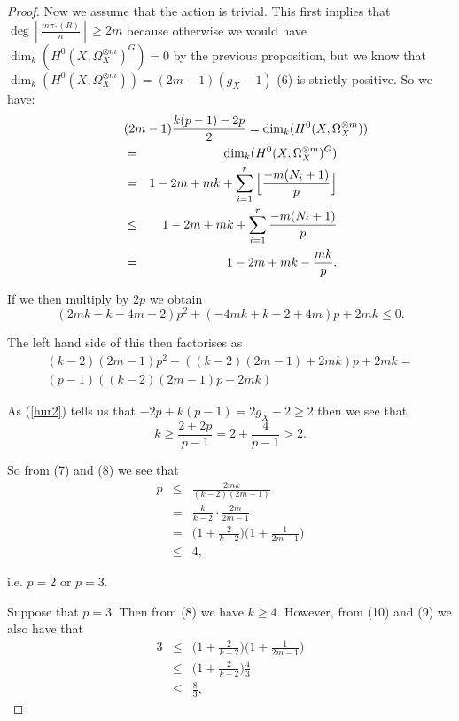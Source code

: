 \documentclass[11pt]{article} %
\theoremstyle{remark}\newtheorem*{rem}{Remark}
\begin{document}
\begin{proof}
	Now we assume that the action is trivial. This first implies that 
	$\deg \left\lfloor\frac{m\pi_*(R)}{n}\right\rfloor \geq 2m$ because otherwise we would 
	have $\dim_k(H^0(X,\Omega_X^{\otimes m})^G)=0$ by the previous proposition, but we know that 
	$\dim_k(H^0(X,\Omega_X^{\otimes m}))=(2m-1)(g_X-1)$ (6) is strictly positive. So we have:
		\begin{eqnarray}
			\lefteqn{(2m-1)\frac{k(p-1)-2p}{2} = \dim_k(H^0(X,\Omega_X^{\otimes m}))} \nonumber\\
			& = & \dim_k(H^0(X,\Omega_X^{\otimes m})^G) \nonumber\\
			& = & 1-2m+mk+\sum_{i=1}^r\Big{\lfloor}\frac{-m(N_i+1)}{p}\Big{\rfloor}\nonumber \\
			& \leq & 1-2m+mk+\sum_{i=1}^r\frac{-m(N_i+1)}{p}\nonumber \\
			& = & 1-2m+mk-\frac{mk}{p}.
		\end{eqnarray}

	If we then multiply by $2p$ we obtain
		\begin{equation}
			(2mk-k-4m+2)p^2+(-4mk+k-2+4m)p+2mk\leq 0.
		\end{equation}

	The left hand side of this then factorises as
		\begin{multline*}
			(k-2)(2m-1)p^2-((k-2)(2m-1)+2mk)p+2mk = \\
			(p-1)((k-2)(2m-1)p-2mk)
		\end{multline*}

	As (\ref{hur2}) tells us that $-2p+k(p-1)=2g_X-2 \geq 2$ then we see that 
		\begin{equation}
			k\geq \frac{2+2p}{p-1}=2+\frac{4}{p-1}>2.
		\end{equation}

	So from (7) and (8) we see that
		\begin{eqnarray}
			p & \leq & \frac{2mk}{(k-2)(2m-1)}\nonumber\\
			& = & \frac{k}{k-2}\cdot\frac{2m}{2m-1}\nonumber\\
			& = & \Big( 1+\frac{2}{k-2} \Big) \Big(1+\frac{1}{2m-1} \Big)\\
			& \leq & 4, \nonumber	
		\end{eqnarray}

	i.e. $p=2$ or $p=3$. 

	Suppose that $p=3$. Then from (8) we have $k\geq 4$. However, from (10) and (9) we also have that 
		\begin{eqnarray*}
			3 & \leq &\Big( 1+\frac{2}{k-2} \Big) \Big(1+\frac{1}{2m-1} \Big)\\
			& \leq & \Big( 1+\frac{2}{k-2} \Big) \frac{4}{3}\\
			& \leq & \frac{8}{3},
		\end{eqnarray*}


\end{proof}
\end{document}
